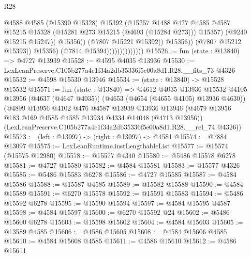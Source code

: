 \begin{lexlean}{R28}
\begin{coremodule}
                                              @4588
                                              @4585
                                              (@15390 @15328)
                                              @15392
                                              (@15257
                                                @1488
                                                @427
                                                @4585
                                                @4587
                                                @15215
                                                @15328
                                                (@15281 @273 @15215 (@4693 (@15284 @273)))
                                                @15357)
                                              (@9240 @15215 @15247))
                                            @15356))
                                        (@7807 @15221 @15392))
                                      @15356))
                                  (@7807 @15212 @15393))
                                @15356)
                              (@7814 @15394))))))))))))))
@15526 := fun (state : @13840) => @4727 @13939
@15528 := @4595 @4035 @13936
@15530 := LexLeanPreserve.C105b277a4c1f34a2db35336f5e00a8d1.R28.__fits_73 @4326
@15532 := @4598 @15530 @13946
@15534 := (state : @13840) -> @15528 @15532
@15571 := fun (state : @13840) =>
  @4612
    @4035
    @13936
    @15532
    @4105
    @13956
    (@4637 (@4647 @4035))
    (@4653 (@4654 (@4655 @4105) @13936 @4630))
    (@4899
      @13956
      @4102
      @476
      @4587
      @13939
      @13936
      @13946
      (@4679 @13956 @183 @169 @4585 @4585 @13934 @4334 @14048 (@4713 @13956))
      (LexLeanPreserve.C105b277a4c1f34a2db35336f5e00a8d1.R28.__rel_74 @4326))
@15573 := (left : @13097) -> (right : @13097) -> @4581
@15574 := @7884 @13097
@15575 := LexLeanRuntime.instLengthableList
@15577 := @15574 (@15575 @12980)
@15578 := @15577 @4340
@15580 := @5486 @15578 @6278
@15581 := @4727 @15580
@15582 := @4584 @15581
@15583 := @15577 @4326
@15585 := @5486 @15583 @6278
@15586 := @4727 @15585
@15587 := @4584 @15586
@15588 := @15587 @4585
@15589 := @15582 @15588
@15590 := @4584 @15589
@15591 := @6270 @15578
@15592 := @15591 @15583
@15594 := @5486 @15592 @6278
@15595 := @15590 @15594
@15597 := @4584 @15595 @4587
@15598 := @4584 @15597
@15600 := @6270 @15592 @24
@15602 := @5486 @15600 @6278
@15603 := @15598 @15602
@15604 := @4584 @15603
@15605 := @13589 @4585
@15606 := @4586 @15605
@15608 := @4584 @15606 @4585
@15610 := @4584 @15608 @4585
@15611 := @4586 @15610
@15612 := @4586 @15611

\end{coremodule}
\end{lexlean}
